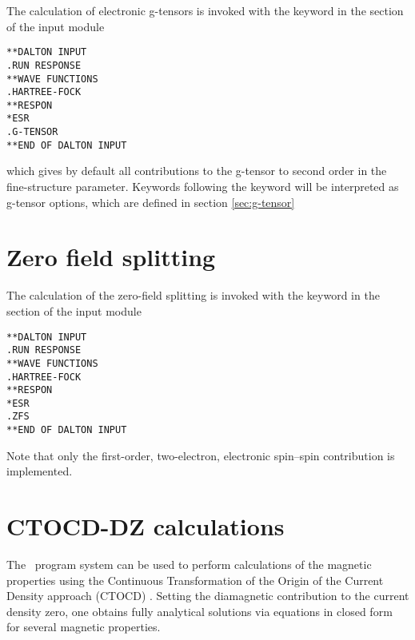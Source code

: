 The calculation of electronic g-tensors is invoked 
with the keyword  in the 
 section of the  input module

\begin{verbatim}
**DALTON INPUT
.RUN RESPONSE
**WAVE FUNCTIONS
.HARTREE-FOCK
**RESPON
*ESR
.G-TENSOR
**END OF DALTON INPUT
\end{verbatim}
which gives by default all contributions to the g-tensor to second order in
the fine-structure parameter. Keywords following the  keyword
will be interpreted as g-tensor options, which are defined in section
\ref{sec:g-tensor}

\section{Zero field splitting}

\begin{center}
\end{center}
The calculation of the zero-field splitting is invoked 
with the keyword  in the 
 section of the  input module
\begin{verbatim}
**DALTON INPUT
.RUN RESPONSE
**WAVE FUNCTIONS
.HARTREE-FOCK
**RESPON
*ESR
.ZFS
**END OF DALTON INPUT
\end{verbatim}
Note that only the first-order, two-electron, electronic spin--spin contribution
is implemented.

\section{CTOCD-DZ calculations}\label{sec:ctocd}

The \dalton\ program system can be used to perform calculations of the magnetic 
properties using the Continuous Transformation of the Origin of the Current Density
approach (CTOCD) . Setting the diamagnetic contribution 
to the current density zero, one obtains fully analytical solutions via equations 
in closed form for several magnetic properties. 


